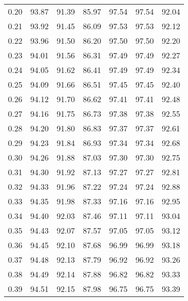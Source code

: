 \begin{tabular}{|c|c|c|c|c|c|c|}
      0.20 &     93.87 &     91.39 &      85.97 &   97.54 &      97.54 &         92.04 \\
      0.21 &     93.92 &     91.45 &      86.09 &   97.53 &      97.53 &         92.12 \\
      0.22 &     93.96 &     91.50 &      86.20 &   97.50 &      97.50 &         92.20 \\
      0.23 &     94.01 &     91.56 &      86.31 &   97.49 &      97.49 &         92.27 \\
      0.24 &     94.05 &     91.62 &      86.41 &   97.49 &      97.49 &         92.34 \\
      0.25 &     94.09 &     91.66 &      86.51 &   97.45 &      97.45 &         92.40 \\
      0.26 &     94.12 &     91.70 &      86.62 &   97.41 &      97.41 &         92.48 \\
      0.27 &     94.16 &     91.75 &      86.73 &   97.38 &      97.38 &         92.55 \\
      0.28 &     94.20 &     91.80 &      86.83 &   97.37 &      97.37 &         92.61 \\
      0.29 &     94.23 &     91.84 &      86.93 &   97.34 &      97.34 &         92.68 \\
      0.30 &     94.26 &     91.88 &      87.03 &   97.30 &      97.30 &         92.75 \\
      0.31 &     94.30 &     91.92 &      87.13 &   97.27 &      97.27 &         92.81 \\
      0.32 &     94.33 &     91.96 &      87.22 &   97.24 &      97.24 &         92.88 \\
      0.33 &     94.35 &     91.98 &      87.33 &   97.16 &      97.16 &         92.95 \\
      0.34 &     94.40 &     92.03 &      87.46 &   97.11 &      97.11 &         93.04 \\
      0.35 &     94.43 &     92.07 &      87.57 &   97.05 &      97.05 &         93.12 \\
      0.36 &     94.45 &     92.10 &      87.68 &   96.99 &      96.99 &         93.18 \\
      0.37 &     94.48 &     92.13 &      87.79 &   96.92 &      96.92 &         93.26 \\
      0.38 &     94.49 &     92.14 &      87.88 &   96.82 &      96.82 &         93.33 \\
      0.39 &     94.51 &     92.15 &      87.98 &   96.75 &      96.75 &         93.39 \\

\end{tabular}
